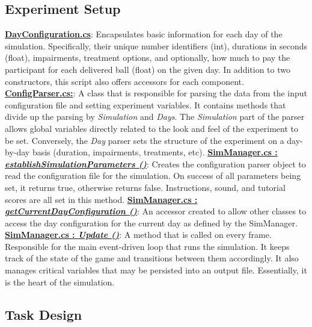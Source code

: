 \documentclass{article}
\begin{document}
\subsection{Experiment Setup} 
\href{https://bit.ly/2FvRTWR}{\textbf{DayConfiguration.cs}}: Encapsulates basic information for each day of the simulation. Specifically, their unique number identifiers (int), durations in seconds (float), impairments, treatment options, and optionally, how much to pay the participant for each delivered ball (float) on the given day. In addition to two constructors, this script also offers accessors for each component. \newline \newline
\href{https://bit.ly/2TZaLYj}{\textbf{ConfigParser.cs:}}: A class that is responsible for parsing the data from the input configuration file and setting experiment variables. It contains methods that divide up the parsing by \textit{Simulation} and \textit{Days}. The \textit{Simulation} part of the parser allows global variables directly related to the look and feel of the experiment to be set. Conversely, the \textit{Day} parser sets the structure of the experiment on a day-by-day basis (duration, impairments, treatments, etc). 
\newline \newline
\href{https://bit.ly/2UhmSzq}{\textbf{SimManager.cs : \textit{establishSimulationParameters ()}}}: Creates the configuration parser object to read the configuration file for the simulation. On success of all parameters being set, it returns true, otherwise returns false. Instructions, sound, and tutorial scores are all set in this method. \newline \newline
\href{https://bit.ly/2UhmSzq}{\textbf{SimManager.cs : \textit{getCurrentDayConfiguration ()}}}: An accessor created to allow other classes to access the day configuration for the current day as defined by the SimManager. \newline \newline
\href{https://bit.ly/2UhmSzq}{\textbf{SimManager.cs : \textit{Update ()}}}: A method that is called on every frame. Responsible for the main event-driven loop that runs the simulation. It keeps track of the state of the game and transitions between them accordingly. It also manages critical variables that may be persisted into an output file. Essentially, it is the heart of the simulation.

\subsection{Task Design}
\end{document}
